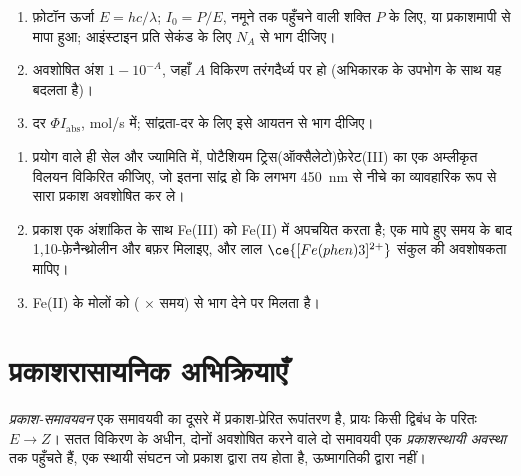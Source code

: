 \begin{method}[लैंप से प्रकाश-अभिक्रिया की दर]\label{met:b3:photochemistry:photochemical-rate}
\begin{enumerate}
  \item फ़ोटॉन ऊर्जा $E = hc/\lambda$;  $I_0 = P/E$, नमूने तक पहुँचने वाली शक्ति $P$ के लिए,
        या प्रकाशमापी से मापा हुआ; आइंस्टाइन प्रति सेकंड के लिए $N_A$ से भाग
        दीजिए।
  \item अवशोषित अंश $1 - 10^{-A}$, जहाँ $A$ विकिरण तरंगदैर्ध्य पर हो (अभिकारक के
        उपभोग के साथ यह बदलता है)।
  \item दर $\Phi I_{\mathrm{abs}}$, mol/s में; सांद्रता-दर के लिए इसे आयतन से भाग दीजिए।
\end{enumerate}
\end{method}

\begin{method}[फ़ेरीऑक्सैलेट प्रकाशमापन]\label{met:b3:photochemistry:actinometry}
\begin{enumerate}
  \item प्रयोग वाले ही सेल और ज्यामिति में, पोटैशियम ट्रिस(ऑक्सैलेटो)फ़ेरेट(III) का एक अम्लीकृत
        विलयन विकिरित कीजिए, जो इतना सांद्र हो कि लगभग \qty{450}{nm} से नीचे का
        व्यावहारिक रूप से सारा प्रकाश अवशोषित कर ले।
  \item प्रकाश एक अंशांकित  के साथ Fe(III) को Fe(II) में अपचयित करता है; एक
        मापे हुए समय के बाद 1,10-फ़ेनैन्थ्रोलीन और बफ़र मिलाइए, और लाल $\ce{[Fe(phen)3]^{2+}}$
        संकुल की अवशोषकता मापिए।
  \item Fe(II) के मोलों को ( $\times$ समय) से भाग देने पर  मिलता है।
\end{enumerate}
\end{method}

\section{प्रकाशरासायनिक अभिक्रियाएँ}

\begin{definition}\label{def:b3:photochemistry:photoisomerisation}
\emph{प्रकाश-समावयवन} एक समावयवी का दूसरे में प्रकाश-प्रेरित
रूपांतरण है, प्रायः किसी द्विबंध के परितः $E \to Z$। सतत
विकिरण के अधीन, दोनों अवशोषित करने वाले दो समावयवी एक
\emph{प्रकाशस्थायी अवस्था} तक पहुँचते हैं, एक स्थायी संघटन
जो प्रकाश द्वारा तय होता है, ऊष्मागतिकी द्वारा नहीं।
\end{definition}

